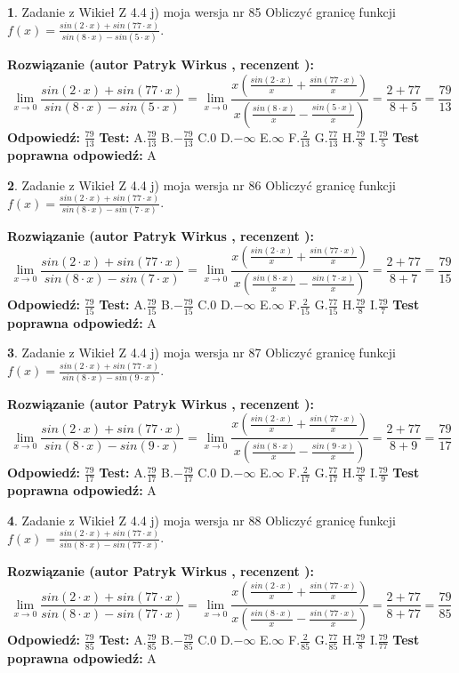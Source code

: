 \documentclass[12pt, a4paper]{article}
\theoremstyle{definition} %
\newtheorem{zad}{}
\newcommand{\zadStart}[1]{\begin{zad}#1\newline}
\newcommand{\zadStop}{\end{zad}}
\newcommand{\rozwStart}[2]{\noindent \textbf{Rozwiązanie (autor #1 , recenzent #2): }\newline}
\newcommand{\rozwStop}{\newline}
\newcommand{\odpStart}{\noindent \textbf{Odpowiedź:}\newline}
\newcommand{\odpStop}{\newline}
\newcommand{\testStart}{\noindent \textbf{Test:}\newline}
\newcommand{\testStop}{\newline}
\newcommand{\kluczStart}{\noindent \textbf{Test poprawna odpowiedź:}\newline}
\newcommand{\kluczStop}{\newline}
\begin{document}
\zadStart{Zadanie z Wikieł Z 4.4 j) moja wersja nr 85}
Obliczyć granicę funkcji $f(x)=\frac{sin(2\cdot x) +sin(77\cdot x)}{sin(8\cdot x) -sin(5\cdot x)}$.
\zadStop
\rozwStart{Patryk Wirkus}{}
$$\lim\limits_{x\to 0}\frac{sin(2\cdot x) +sin(77\cdot x)}{sin(8\cdot x) -sin(5\cdot x)}=\lim\limits_{x\to 0}\frac{x(\frac{sin(2\cdot x)}{x}+\frac{sin(77\cdot x)}{x})}{x(\frac{sin(8\cdot x)}{x}-\frac{sin(5\cdot x)}{x})}=\frac{2+77}{8+5} = \frac{79}{13}$$
\rozwStop
\odpStart
$\frac{79}{13}$
\odpStop
\testStart
A.$\frac{79}{13}$
B.$-\frac{79}{13}$
C.$0$
D.$-\infty$
E.$\infty$
F.$\frac{2}{13}$
G.$\frac{77}{13}$
H.$\frac{79}{8}$
I.$\frac{79}{5}$
\testStop
\kluczStart
A
\kluczStop



\zadStart{Zadanie z Wikieł Z 4.4 j) moja wersja nr 86}
Obliczyć granicę funkcji $f(x)=\frac{sin(2\cdot x) +sin(77\cdot x)}{sin(8\cdot x) -sin(7\cdot x)}$.
\zadStop
\rozwStart{Patryk Wirkus}{}
$$\lim\limits_{x\to 0}\frac{sin(2\cdot x) +sin(77\cdot x)}{sin(8\cdot x) -sin(7\cdot x)}=\lim\limits_{x\to 0}\frac{x(\frac{sin(2\cdot x)}{x}+\frac{sin(77\cdot x)}{x})}{x(\frac{sin(8\cdot x)}{x}-\frac{sin(7\cdot x)}{x})}=\frac{2+77}{8+7} = \frac{79}{15}$$
\rozwStop
\odpStart
$\frac{79}{15}$
\odpStop
\testStart
A.$\frac{79}{15}$
B.$-\frac{79}{15}$
C.$0$
D.$-\infty$
E.$\infty$
F.$\frac{2}{15}$
G.$\frac{77}{15}$
H.$\frac{79}{8}$
I.$\frac{79}{7}$
\testStop
\kluczStart
A
\kluczStop



\zadStart{Zadanie z Wikieł Z 4.4 j) moja wersja nr 87}
Obliczyć granicę funkcji $f(x)=\frac{sin(2\cdot x) +sin(77\cdot x)}{sin(8\cdot x) -sin(9\cdot x)}$.
\zadStop
\rozwStart{Patryk Wirkus}{}
$$\lim\limits_{x\to 0}\frac{sin(2\cdot x) +sin(77\cdot x)}{sin(8\cdot x) -sin(9\cdot x)}=\lim\limits_{x\to 0}\frac{x(\frac{sin(2\cdot x)}{x}+\frac{sin(77\cdot x)}{x})}{x(\frac{sin(8\cdot x)}{x}-\frac{sin(9\cdot x)}{x})}=\frac{2+77}{8+9} = \frac{79}{17}$$
\rozwStop
\odpStart
$\frac{79}{17}$
\odpStop
\testStart
A.$\frac{79}{17}$
B.$-\frac{79}{17}$
C.$0$
D.$-\infty$
E.$\infty$
F.$\frac{2}{17}$
G.$\frac{77}{17}$
H.$\frac{79}{8}$
I.$\frac{79}{9}$
\testStop
\kluczStart
A
\kluczStop



\zadStart{Zadanie z Wikieł Z 4.4 j) moja wersja nr 88}
Obliczyć granicę funkcji $f(x)=\frac{sin(2\cdot x) +sin(77\cdot x)}{sin(8\cdot x) -sin(77\cdot x)}$.
\zadStop
\rozwStart{Patryk Wirkus}{}
$$\lim\limits_{x\to 0}\frac{sin(2\cdot x) +sin(77\cdot x)}{sin(8\cdot x) -sin(77\cdot x)}=\lim\limits_{x\to 0}\frac{x(\frac{sin(2\cdot x)}{x}+\frac{sin(77\cdot x)}{x})}{x(\frac{sin(8\cdot x)}{x}-\frac{sin(77\cdot x)}{x})}=\frac{2+77}{8+77} = \frac{79}{85}$$
\rozwStop
\odpStart
$\frac{79}{85}$
\odpStop
\testStart
A.$\frac{79}{85}$
B.$-\frac{79}{85}$
C.$0$
D.$-\infty$
E.$\infty$
F.$\frac{2}{85}$
G.$\frac{77}{85}$
H.$\frac{79}{8}$
I.$\frac{79}{77}$
\testStop
\kluczStart
A
\kluczStop
\end{document}
